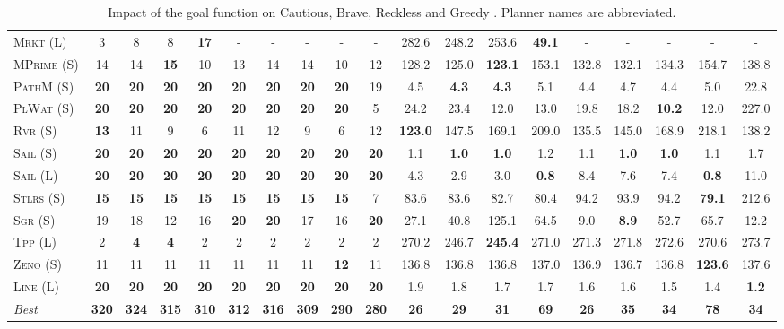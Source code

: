 \documentclass[11pt,landscape]{article}
\begin{document}
\begin{table}[tb]
{\begin{tabular}{|l||ccccccccc||ccccccccc||}
\textsc{Mrkt} (L)&3&8&8&\textbf{17}&-&-&-&-&-&282.6&248.2&253.6&\textbf{49.1}&-&-&-&-&-\\
\textsc{MPrime} (S)&14&14&\textbf{15}&10&13&14&14&10&12&128.2&125.0&\textbf{123.1}&153.1&132.8&132.1&134.3&154.7&138.8\\
\textsc{PathM} (S)&\textbf{20}&\textbf{20}&\textbf{20}&\textbf{20}&\textbf{20}&\textbf{20}&\textbf{20}&\textbf{20}&19&4.5&\textbf{4.3}&\textbf{4.3}&5.1&4.4&4.7&4.4&5.0&22.8\\
\textsc{PlWat} (S)&\textbf{20}&\textbf{20}&\textbf{20}&\textbf{20}&\textbf{20}&\textbf{20}&\textbf{20}&\textbf{20}&5&24.2&23.4&12.0&13.0&19.8&18.2&\textbf{10.2}&12.0&227.0\\
\textsc{Rvr} (S)&\textbf{13}&11&9&6&11&12&9&6&12&\textbf{123.0}&147.5&169.1&209.0&135.5&145.0&168.9&218.1&138.2\\
\textsc{Sail} (S)&\textbf{20}&\textbf{20}&\textbf{20}&\textbf{20}&\textbf{20}&\textbf{20}&\textbf{20}&\textbf{20}&\textbf{20}&1.1&\textbf{1.0}&\textbf{1.0}&1.2&1.1&\textbf{1.0}&\textbf{1.0}&1.1&1.7\\
\textsc{Sail} (L)&\textbf{20}&\textbf{20}&\textbf{20}&\textbf{20}&\textbf{20}&\textbf{20}&\textbf{20}&\textbf{20}&\textbf{20}&4.3&2.9&3.0&\textbf{0.8}&8.4&7.6&7.4&\textbf{0.8}&11.0\\
\textsc{Stlrs} (S)&\textbf{15}&\textbf{15}&\textbf{15}&\textbf{15}&\textbf{15}&\textbf{15}&\textbf{15}&\textbf{15}&7&83.6&83.6&82.7&80.4&94.2&93.9&94.2&\textbf{79.1}&212.6\\
\textsc{Sgr} (S)&19&18&12&16&\textbf{20}&\textbf{20}&17&16&\textbf{20}&27.1&40.8&125.1&64.5&9.0&\textbf{8.9}&52.7&65.7&12.2\\
\textsc{Tpp} (L)&2&\textbf{4}&\textbf{4}&2&2&2&2&2&2&270.2&246.7&\textbf{245.4}&271.0&271.3&271.8&272.6&270.6&273.7\\
\textsc{Zeno} (S)&11&11&11&11&11&11&11&\textbf{12}&11&136.8&136.8&136.8&137.0&136.9&136.7&136.8&\textbf{123.6}&137.6\\
\textsc{Line} (L)&\textbf{20}&\textbf{20}&\textbf{20}&\textbf{20}&\textbf{20}&\textbf{20}&\textbf{20}&\textbf{20}&\textbf{20}&1.9&1.8&1.7&1.7&1.6&1.6&1.5&1.4&\textbf{1.2}
\\\hline
\textit{Best}&\textbf{320}&\textbf{324}&\textbf{315}&\textbf{310}&\textbf{312}&\textbf{316}&\textbf{309}&\textbf{290}&\textbf{280}&\textbf{26}&\textbf{29}&\textbf{31}&\textbf{69}&\textbf{26}&\textbf{35}&\textbf{34}&\textbf{78}&\textbf{34}\\\hline

        \end{tabular}}
        \caption{Impact of the goal function on Cautious, Brave, Reckless and Greedy \pattyd. Planner names are abbreviated.}
        \label{tab:abl-gf}
        \end{table}
        
\end{document}
